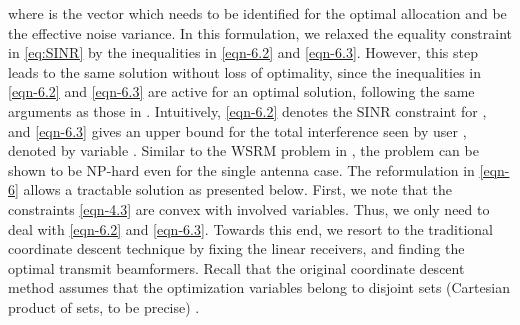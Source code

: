 where  is the vector which needs to be identified for the optimal allocation and  be the effective noise variance. In this formulation, we relaxed the equality constraint in \eqref{eq:SINR} by the inequalities in \eqref{eqn-6.2} and \eqref{eqn-6.3}. However, this step leads to the same solution without loss of optimality, since the inequalities in \eqref{eqn-6.2} and \eqref{eqn-6.3} are active for an optimal solution, following the same arguments as those in \cite{tran2012fast}. Intuitively, \eqref{eqn-6.2} denotes the \ac{SINR} constraint for , and \eqref{eqn-6.3} gives an upper bound for the total interference seen by user , denoted by variable . Similar to the \ac{WSRM} problem in \cite{tran2012fast}, the problem can be shown to be NP-hard even for the single antenna case. The reformulation in \eqref{eqn-6} allows a tractable solution as presented below. First, we note that the constraints \eqref{eqn-4.3} are convex with involved variables. Thus, we only need to deal with \eqref{eqn-6.2} and \eqref{eqn-6.3}. Towards this end, we resort to the traditional coordinate descent technique by fixing the linear receivers, and finding the optimal transmit beamformers. Recall that the original coordinate descent method assumes that the optimization variables belong to disjoint sets (Cartesian product of sets, to be precise) \cite{xu2013block}.

